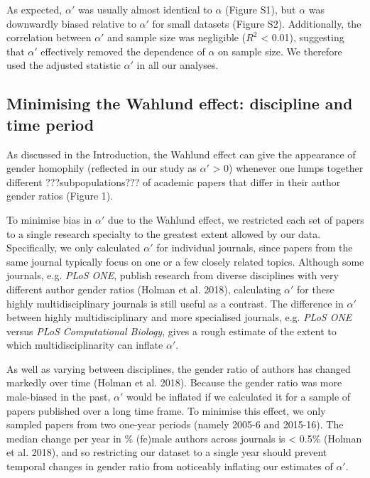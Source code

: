 \documentclass[12pt,]{article}
\begin{document}
As expected, \(\alpha'\) was usually almost identical to \(\alpha\)
(Figure S1), but \(\alpha\) was downwardly biased relative to
\(\alpha'\) for small datasets (Figure S2). Additionally, the
correlation between \(\alpha'\) and sample size was negligible (\(R^2\)
\textless{} 0.01), suggesting that \(\alpha'\) effectively removed the
dependence of \(\alpha\) on sample size. We therefore used the adjusted
statistic \(\alpha'\) in all our analyses.

\subsection{Minimising the Wahlund effect: discipline and time
period}\label{minimising-the-wahlund-effect-discipline-and-time-period}

As discussed in the Introduction, the Wahlund effect can give the
appearance of gender homophily (reflected in our study as \(\alpha'\)
\textgreater{} 0) whenever one lumps together different
???subpopulations??? of academic papers that differ in their author
gender ratios (Figure 1).

To minimise bias in \(\alpha'\) due to the Wahlund effect, we restricted
each set of papers to a single research specialty to the greatest extent
allowed by our data. Specifically, we only calculated \(\alpha'\) for
individual journals, since papers from the same journal typically focus
on one or a few closely related topics. Although some journals, e.g.
\emph{PLoS ONE}, publish research from diverse disciplines with very
different author gender ratios (Holman et al. 2018), calculating
\(\alpha'\) for these highly multidisciplinary journals is still useful
as a contrast. The difference in \(\alpha'\) between highly
multidisciplinary and more specialised journals, e.g. \emph{PLoS ONE}
versus \emph{PLoS Computational Biology}, gives a rough estimate of the
extent to which multidisciplinarity can inflate \(\alpha'\).

As well as varying between disciplines, the gender ratio of authors has
changed markedly over time (Holman et al. 2018). Because the gender
ratio was more male-biased in the past, \(\alpha'\) would be inflated if
we calculated it for a sample of papers published over a long time
frame. To minimise this effect, we only sampled papers from two one-year
periods (namely 2005-6 and 2015-16). The median change per year in \%
(fe)male authors across journals is \textless{} 0.5\% (Holman et al.
2018), and so restricting our dataset to a single year should prevent
temporal changes in gender ratio from noticeably inflating our estimates
of \(\alpha'\).
\end{document}
